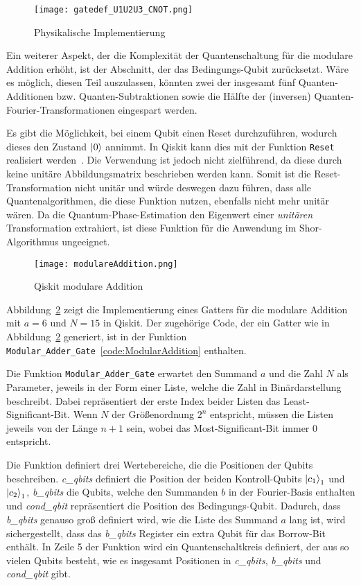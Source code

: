 \begin{figure}[H]
  \centering
  \texttt{[image: gatedef\_U1U2U3\_CNOT.png]}
  \caption{Physikalische Implementierung~\cite{ibmqx5}}
  \label{fig:gatedef_U1U2U3_CNOT}
\end{figure}

Ein weiterer Aspekt, 
der die Komplexität der Quantenschaltung für die modulare Addition erhöht, 
ist der Abschnitt, der das Bedingungs-Qubit zurücksetzt.
Wäre es möglich, diesen Teil auszulassen, könnten zwei der insgesamt fünf Quanten-Additionen bzw. 
Quanten-Subtraktionen sowie die Hälfte der (inversen) Quanten-Fourier-Transformationen eingespart werden.

Es gibt die Möglichkeit, bei einem Qubit einen Reset durchzuführen, wodurch dieses den Zustand \(\ket{0}\) annimmt.
In Qiskit kann dies mit der Funktion \texttt{Reset} realisiert werden~\cite{qiskitReset}.
Die Verwendung ist jedoch nicht zielführend, da diese durch keine unitäre Abbildungsmatrix
beschrieben werden kann.
Somit ist die Reset-Transformation nicht unitär und würde deswegen dazu führen, dass alle Quantenalgorithmen, 
die diese Funktion nutzen, ebenfalls nicht mehr unitär wären.
Da die Quantum-Phase-Estimation den Eigenwert einer \textit{unitären} Transformation extrahiert, 
ist diese Funktion für die Anwendung im Shor-Algorithmus ungeeignet.

\begin{figure}[H]
  \centering
  \texttt{[image: modulareAddition.png]}
  \caption{Qiskit modulare Addition}
  \label{fig:ModularAddition}
\end{figure}

Abbildung~\ref{fig:ModularAddition} zeigt die Implementierung eines Gatters für die modulare Addition 
mit \(a = 6\) und \(N = 15\) in Qiskit.
Der zugehörige Code, der ein Gatter wie in Abbildung~\ref{fig:ModularAddition} generiert, 
ist in der Funktion \texttt{Modular\_Adder\_Gate}~\ref{code:ModularAddition} enthalten.

Die Funktion \texttt{Modular\_Adder\_Gate} erwartet den Summand \(a\) und die Zahl \(N\) als Parameter, 
jeweils in der Form einer Liste, 
welche die Zahl in Binärdarstellung beschreibt.
Dabei repräsentiert der erste Index beider Listen das Least-Significant-Bit.
Wenn \(N\) der Größenordnung \(2^n\) entspricht, 
müssen die Listen jeweils von der Länge \(n+1\) sein, 
wobei das Most-Significant-Bit immer \(0\) entspricht.

Die Funktion definiert drei Wertebereiche, die die Positionen der Qubits beschreiben.
\textit{c\_qbits} definiert die Position der beiden Kontroll-Qubits \(\ket{c_1}_1\) und \(\ket{c_2}_1\), 
\textit{b\_qbits} die Qubits, welche den Summanden \(b\) 
in der Fourier-Basis enthalten 
und \textit{cond\_qbit} repräsentiert die Position des Bedingungs-Qubit.
Dadurch, dass \textit{b\_qbits} genauso groß definiert wird, 
wie die Liste des Summand \(a\) lang ist, wird sichergestellt, 
dass das \textit{b\_qbits} Register ein extra Qubit für das Borrow-Bit enthält.
In Zeile 5 der Funktion wird ein Quantenschaltkreis definiert, 
der aus so vielen Qubits besteht, wie es insgesamt Positionen in 
\textit{c\_qbits}, \textit{b\_qbits} und \textit{cond\_qbit} gibt.

